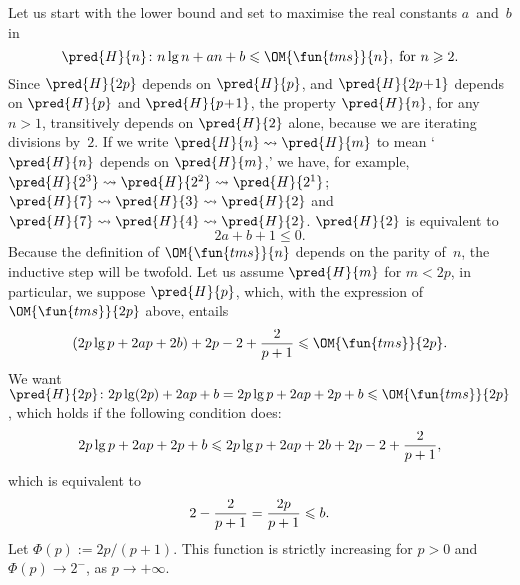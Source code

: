 Let us start with the lower bound and set to maximise the
real constants \(a\)~and~\(b\) in
\begin{equation*}
\abovedisplayskip=0pt
\belowdisplayskip=2pt
\pred{H}{n} \colon n\lg n + an + b \leqslant \OM{\fun{tms}}{n},
\; \text{for \(n \geqslant 2\).}
\end{equation*}
Since \(\pred{H}{2p}\) depends on \(\pred{H}{p}\), and
\(\pred{H}{2p\!+\!1}\) depends on \(\pred{H}{p}\) and
\(\pred{H}{p\!+\!1}\), the property \(\pred{H}{n}\), for any \(n>1\),
transitively depends on \(\pred{H}{2}\) alone, because we are
iterating divisions by~\(2\). If we write \(\pred{H}{n} \leadsto
\pred{H}{m}\) to mean `\(\pred{H}{n}\) depends on \(\pred{H}{m}\),' we
have, for example, \(\pred{H}{2^3} \leadsto \pred{H}{2^2} \leadsto
\pred{H}{2^1}\); \(\pred{H}{7} \leadsto \pred{H}{3} \leadsto
\pred{H}{2}\) and \(\pred{H}{7} \leadsto \pred{H}{4} \leadsto
\pred{H}{2}\). \(\pred{H}{2}\) is equivalent to
\begin{equation}
2a + b + 1 \leqslant 0.
\label{ineq:base_lower_Atms}
\end{equation}
Because the definition of \(\OM{\fun{tms}}{n}\) depends on the parity
of~\(n\), the inductive step will be twofold. Let us assume
\(\pred{H}{m}\) for \(m < 2p\), in particular, we suppose
\(\pred{H}{p}\), which, with the expression of \(\OM{\fun{tms}}{2p}\)
above, entails
\begin{equation*}
\abovedisplayskip=2pt
\belowdisplayskip=2pt
 (2p\lg p + 2ap + 2b) + 2p - 2 + \frac{2}{p+1} \leqslant \OM{\fun{tms}}{2p}.
\end{equation*}
We want \(\pred{H}{2p} \colon 2p\lg(2p) + 2ap + b
= 2p\lg p + 2ap + 2p + b \leqslant \OM{\fun{tms}}{2p}\), which holds
if the following condition does:
\begin{equation*}
\abovedisplayskip=0pt
\belowdisplayskip=2pt
2p\lg p + 2ap + 2p + b \leqslant 2p\lg p + 2ap + 2b + 2p - 2 + \frac{2}{p+1},
\end{equation*}
which is equivalent to
\begin{equation*}
\abovedisplayskip=0pt
\belowdisplayskip=2pt
2 - \frac{2}{p+1} = \frac{2p}{p+1} \leqslant b.
\end{equation*}
Let \(\Phi(p) := 2p/(p+1)\). This function is strictly increasing for
\(p > 0\) and \(\Phi(p) \to 2^{-}\), as \(p \to +\infty\).


